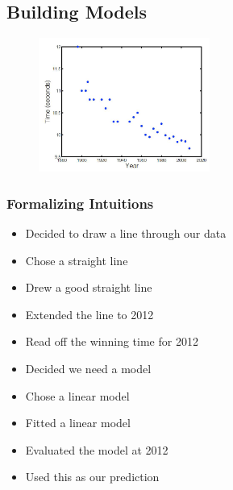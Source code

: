 	\subsection{Building Models}

	\begin{figure}[ht]
	\centering
	\includegraphics[width=0.5\textwidth]{assets/olympics.png}
	\end{figure}


		\subsubsection{Formalizing Intuitions}


	\begin{minipage}{\linewidth}
	      \centering
	      \begin{minipage}{0.45\linewidth}
	          \begin{itemize}
	          	\item Decided to draw a line through our data
	          	\item Chose a straight line
	          	\item Drew a good straight line
	          	\item Extended the line to 2012
	          	\item Read off the winning time for 2012
	          \end{itemize}
	      \end{minipage}
	      \hspace{0.05\linewidth}
	\begin{minipage}{0.45\linewidth}
	          \begin{itemize}
	          	\item Decided we need a model
	          	\item Chose a linear model
	          	\item Fitted a linear model
	          	\item Evaluated the model at 2012
	          	\item Used this as our prediction
	          \end{itemize}
	      \end{minipage}
	\end{minipage}


